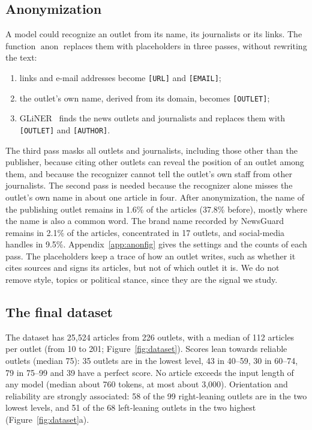 \documentclass[11pt,a4paper]{article}
\newcommand{\anon}{\operatorname{anon}}
\begin{document}
\subsection{Anonymization}\label{sec:anon}
A model could recognize an outlet from its name, its journalists or its links. The function $\anon$ replaces them with
placeholders in three passes, without rewriting the text:
\begin{enumerate}
  \item links and e-mail addresses become \texttt{[URL]} and \texttt{[EMAIL]};
  \item the outlet's own name, derived from its domain, becomes \texttt{[OUTLET]};
  \item GLiNER~\cite{zaratiana2024gliner} finds the news outlets and journalists and replaces them with
        \texttt{[OUTLET]} and \texttt{[AUTHOR]}.
\end{enumerate}
The third pass masks all outlets and journalists, including those other than the publisher, because citing other
outlets can reveal the position of an outlet among them, and because the recognizer cannot tell the outlet's own staff
from other journalists. The second pass is needed because the recognizer alone misses the outlet's own name in about one
article in four. After anonymization, the name of the publishing outlet remains in 1.6\% of the articles (37.8\%
before), mostly where the name is also a common word. The brand name recorded by NewsGuard remains in 2.1\% of the
articles, concentrated in 17 outlets, and social-media handles in 9.5\%. Appendix~\ref{app:anonfig} gives
the settings and the counts of each pass. The placeholders keep a trace of how an outlet writes, such as whether it
cites sources and signs its articles, but not of which outlet it is. We do not remove style, topics or political stance,
since they are the signal we study.

\subsection{The final dataset}\label{sec:final}
The dataset has 25,524 articles from 226 outlets, with a median of 112 articles per outlet (from 10 to 201;
Figure~\ref{fig:dataset}). Scores lean towards reliable outlets (median 75): 35 outlets are in the lowest level, 43 in
40--59, 30 in 60--74, 79 in 75--99 and 39 have a perfect score. No article exceeds the input length of any model (median
about 760 tokens, at most about 3,000). Orientation and reliability are strongly associated: 58 of the 99 right-leaning
outlets are in the two lowest levels, and 51 of the 68 left-leaning outlets in the two highest
(Figure~\ref{fig:dataset}a).
\end{document}
